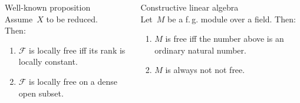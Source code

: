 \documentclass[10pt,utf8,notheorems,compress]{beamer}
\newcommand{\F}{\mathcal{F}}
\newcommand{\?}{\,{:}\,}
\renewcommand{\_}{\mathpunct{.}\,}
\begin{document}
{  \begin{columns}[t,onlytextwidth]
    \hspace{-1em}
    \begin{column}{0.5\textwidth}
      \begin{block}{Well-known proposition}
        \ \\[-1.1em]
        Assume~$X$ to be reduced. \\ Then:
        \begin{enumerate}
        \item $\F$ is locally free iff its rank is locally constant.
        \item $\F$ is locally free on a dense open subset.
        \end{enumerate}
      \end{block}
    \end{column}
    \hspace{2em}
    \begin{column}{0.51\textwidth}
      \begin{block}{Constructive linear algebra}
        \ \\[-1.1em]
        Let~$M$ be a f.\,g. module over a field. Then:
        \begin{enumerate}
          \item $M$ is free iff the number above is an ordinary natural number.
          \item $M$ is always not not free.
        \end{enumerate}
      \end{block}
    \end{column}
  \end{columns}

}
\end{document}
